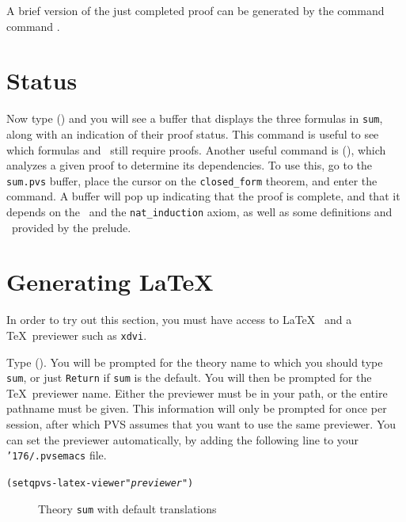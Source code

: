 {\smaller\smaller
\begin{alltt}

\end{alltt}}

A brief version of the just completed proof can be generated by the command
command .

\section{Status}

Now type  () and you will see a
buffer that displays the three formulas in \texttt{sum}, along with an
indication of their proof status.  This command is useful to see which
formulas and \tccs\ still require proofs.  Another useful command is
 (), which analyzes a given proof to
determine its dependencies.  To use this, go to the \texttt{sum.pvs}
buffer, place the cursor on the \texttt{closed\_form} theorem, and enter
the command.  A buffer will pop up indicating that the proof is
complete, and that it depends on the \tccs\ and the \texttt{nat\_induction}
axiom, as well as some definitions and \tccs\ provided by the prelude.

\section{Generating \LaTeX}

In order to try out this section, you must have access to \LaTeX\
 and a \TeX\ previewer such as
\texttt{xdvi}.

Type  ().  You will be prompted for
the theory name to which you should type \texttt{sum}, or just
\texttt{Return} if \texttt{sum} is the default.  You will then be prompted
for the \TeX\ previewer name.  Either the previewer must be in your path,
or the entire pathname must be given.  This information will only be
prompted for once per session, after which PVS assumes that you want to
use the same previewer.  You can set the previewer automatically,
by adding the following line to your \texttt{\char'176/.pvsemacs} file.
{\small
\begin{alltt}
\hspace*{2em}  (setq pvs-latex-viewer "\textit{previewer}")
\end{alltt}}

\begin{figure}[ht]
\begin{center}
\begin{boxedminipage}{\textwidth}
{\small\small}
\end{boxedminipage}
\end{center}
\caption{Theory \texttt{sum} with default translations}\label{sum-plain}
\end{figure}

